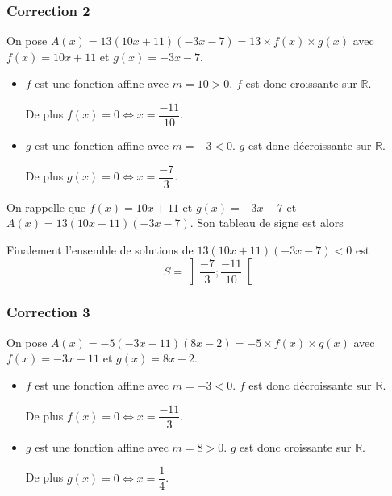 \documentclass[15pt, mathserif]{beamer}
\begin{document}
\begin{frame}
\vspace{-10mm}
	\frametitle{Correction 2}
On pose $A(x) = 13(10x+11)(-3x-7) = 13\times f(x) \times g(x)$ avec $f(x) = 10x+11$ et $g(x) = -3x-7$.

\begin{itemize}
	\item $f$ est une fonction affine avec $m =10>0$. $f$ est donc croissante sur $\mathbb{R}$.

	 De plus $f(x) = 0 \Leftrightarrow x = \dfrac{-11}{10}$.
	\item $g$ est une fonction affine avec $m =-3<0$. $g$ est donc décroissante sur $\mathbb{R}$.

	 De plus $g(x) = 0 \Leftrightarrow x = \dfrac{-7}{3}$.
\end{itemize}

 \end{frame}


\begin{frame}On rappelle que $f(x) = 10x+11$ et $g(x) = -3x-7$ et $A(x) = 13(10x+11)(-3x-7)$. Son tableau de signe est alors 

\medskip \hfil
{}

 Finalement l'ensemble de solutions de $13(10x+11)(-3x-7)<0$ est\[S = \left]\dfrac{-7}{3};\dfrac{-11}{10}\right[\]

\end{frame}


\begin{frame}
\vspace{-10mm}
	\frametitle{Correction 3}
On pose $A(x) = -5(-3x-11)(8x-2) = -5\times f(x) \times g(x)$ avec $f(x) = -3x-11$ et $g(x) = 8x-2$.

\begin{itemize}
	\item $f$ est une fonction affine avec $m =-3<0$. $f$ est donc décroissante sur $\mathbb{R}$.

	 De plus $f(x) = 0 \Leftrightarrow x = \dfrac{-11}{3}$.
	\item $g$ est une fonction affine avec $m =8>0$. $g$ est donc croissante sur $\mathbb{R}$.

	 De plus $g(x) = 0 \Leftrightarrow x = \dfrac{1}{4}$.
\end{itemize}

 \end{frame}
\end{document}
